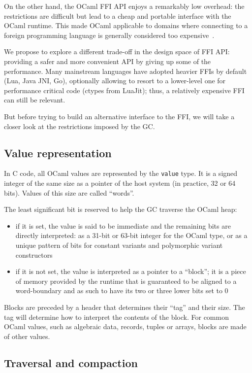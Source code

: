 \documentclass[a4paper]{easychair}
\newcommand{\caml}[1]{\smash{\lstinline{#1}}}
\newcommand{\cpp}[1]{\lstinline[style=C++]{#1}}
\begin{document}
On the other hand, the OCaml FFI API enjoys a remarkably low overhead:
the restrictions are difficult but lead to a cheap and portable
interface with the OCaml runtime. This made OCaml applicable to domains
where connecting to a foreign programming language is generally
considered too expensive~\citep{bourke:hal-01408230}.

We propose to explore a different trade-off in the design space of FFI
API: providing a safer and more convenient API by giving up some of the
performance.  Many mainstream languages have adopted heavier FFIs by default
(Lua, Java JNI, Go), optionally allowing to resort to a lower-level one
for performance critical code (ctypes from LuaJit); thus, a relatively
expensive FFI can still be relevant.

But before trying to build an alternative interface to the FFI, we will take a
closer look at the restrictions imposed by the GC.

\subsection{Value representation}

In C code, all OCaml values are represented by the \cpp{value} type. It is a
signed integer of the same size as a pointer of the host system (in practice,
32 or 64 bits). Values of this size are called ``words''.

The least significant bit is reserved to help the GC traverse the OCaml
heap:
%
\begin{itemize}
\item if it is set, the value is said to be immediate and the remaining bits
      are directly interpreted: as a 31-bit or 63-bit integer for the
      \caml{int} OCaml type, or as a unique pattern of bits for constant
      variants and polymorphic variant constructors
\item if it is not set, the value is interpreted as a pointer to a
      ``block''; it is a piece of memory provided by the runtime that is
      guaranteed to be aligned to a word-boundary and as such to have its two
      or three lower bits set to 0
\end{itemize}

Blocks are preceded by a header that determines their ``tag'' and their
size. The tag will determine how to interpret the contents of the block.
For common OCaml values, such as algebraic data, records, tuples or
arrays, blocks are made of other values.

\subsection{Traversal and compaction}
\end{document}
